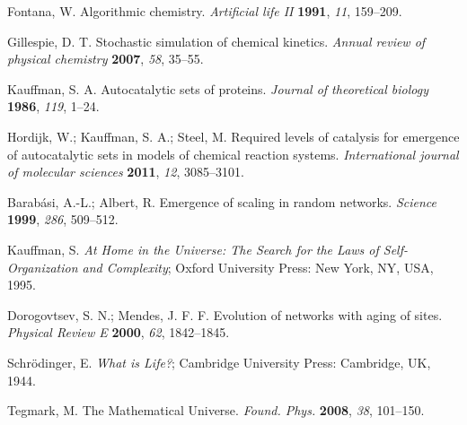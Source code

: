 \documentclass[preprint,12pt]{elsarticle}
\begin{document}

%

\begin{thebibliography}{999}

Fontana, W. Algorithmic chemistry. \textit{Artificial life II} \textbf{1991}, \textit{11}, 159–209.

Gillespie, D. T. Stochastic simulation of chemical kinetics. \textit{Annual review of physical chemistry} \textbf{2007}, \textit{58}, 35–55.

Kauffman, S. A. Autocatalytic sets of proteins. \textit{Journal of theoretical biology} \textbf{1986}, \textit{119}, 1–24.

Hordijk, W.; Kauffman, S. A.; Steel, M. Required levels of catalysis for emergence of autocatalytic sets in models of chemical reaction systems. \textit{International journal of molecular sciences} \textbf{2011}, \textit{12}, 3085–3101.

Barabási, A.-L.; Albert, R. Emergence of scaling in random networks. \textit{Science} \textbf{1999}, \textit{286}, 509–512.

Kauffman, S. \textit{At Home in the Universe: The Search for the Laws of Self-Organization and Complexity}; Oxford University Press: New York, NY, USA, 1995.

Dorogovtsev, S. N.; Mendes, J. F. F. Evolution of networks with aging of sites. \textit{Physical Review E} \textbf{2000}, \textit{62}, 1842–1845.

Schrödinger, E. \textit{What is Life?}; Cambridge University Press: Cambridge, UK, 1944.

Tegmark, M. The Mathematical Universe. \textit{Found. Phys.} \textbf{2008}, \textit{38}, 101–150. 


\end{thebibliography}
\end{document}
